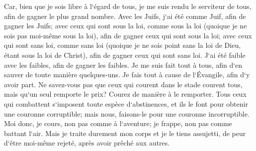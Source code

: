\verse Car, bien que je sois libre à l`égard de tous, je me suis rendu le serviteur de tous, afin de gagner le plus grand nombre. 
\verse Avec les Juifs, j`ai été comme Juif, afin de gagner les Juifs; avec ceux qui sont sous la loi, comme sous la loi (quoique je ne sois pas moi-même sous la loi), afin de gagner ceux qui sont sous la loi; 
\verse avec ceux qui sont sans loi, comme sans loi (quoique je ne sois point sans la loi de Dieu, étant sous la loi de Christ), afin de gagner ceux qui sont sans loi. 
\verse J`ai été faible avec les faibles, afin de gagner les faibles. Je me suis fait tout à tous, afin d`en sauver de toute manière quelques-uns. 
\verse Je fais tout à cause de l`Évangile, afin d`y avoir part. 
\verse Ne savez-vous pas que ceux qui courent dans le stade courent tous, mais qu`un seul remporte le prix? Courez de manière à le remporter. 
\verse Tous ceux qui combattent s`imposent toute espèce d`abstinences, et ils le font pour obtenir une couronne corruptible; mais nous, faisons-le pour une couronne incorruptible. 
\verse Moi donc, je cours, non pas comme à l`aventure; je frappe, non pas comme battant l`air. 
\verse Mais je traite durement mon corps et je le tiens assujetti, de peur d`être moi-même rejeté, après avoir prêché aux autres. 

